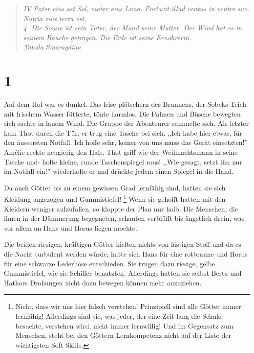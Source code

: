 \documentclass[11pt,titlepage,a5paper]{book}
\begin{document}
\begin{quotation}

\emph{IV Pater eius est Sol, mater eius Luna. Portavit illud ventus in ventre suo. Nutrix eius terra est. \\4. Die Sonne ist sein Vater, der Mond seine Mutter. Der Wind hat es in seinem Bauche getragen. Die Erde ist seine Ernährerin.\\Tabula Smaragdina}

\end{quotation}



\section*{1}

Auf dem Hof war es dunkel. Das leise plätschern des Brunnens, der Sobeks Teich mit frischem Wasser fütterte, tönte harmlos. Die Palmen und Büsche bewegten sich sachte in lauem Wind. Die Gruppe der Abenteurer sammelte sich. Als letzter kam Thot durch die Tür, er trug eine Tasche bei sich. ,,Ich habe hier etwas, für den äussersten Notfall. Ich hoffe sehr, keiner von uns muss das Gerät einsetzten!'' Amélie reckte neugierig den Hals. Thot griff wie der Weihnachtsmann in seine Tasche und- holte kleine, runde Taschenspiegel raus! ,,Wie gesagt, setzt ihn nur im Notfall ein!'' wiederholte er und drückte jedem einen Spiegel in die Hand. 

Da auch Götter bis zu einem gewissen Grad lernfähig sind, hatten sie sich Kleidung angezogen und Gummistiefel! \footnote{Nicht, dass wir uns hier falsch verstehen! Prinzipiell sind alle Götter immer lernfähig! Allerdings sind sie, was jeder, der eine Zeit lang die Schule besuchte, verstehen wird, nicht immer lernwillig! Und im Gegensatz zum Menschen, steht bei den Göttern Lernkompetenz nicht auf der Liste der wichtigsten Soft Skills.} Wenn sie gehofft hatten mit den Kleidern weniger aufzufallen, so klappte der Plan nur halb. Die Menschen, die ihnen in der Dämmerung begegneten, schauten verblüfft bis ängstlich drein, was vor allem an Hans und Horus liegen mochte.

Die beiden riesigen, kräftigen Götter hielten nichts von lästigen Stoff und da es die Nacht turbulent werden würde, hatte sich Hans für eine rotbraune und Horus für eine schwarze Lederhose entschieden. Sie trugen dazu riesige, gelbe Gummistiefel, wie sie Schiffer benutzten. Allerdings hatten sie selbst Berta und Hathors Drohungen nicht dazu bewegen können mehr anzuziehen. 
\end{document}
